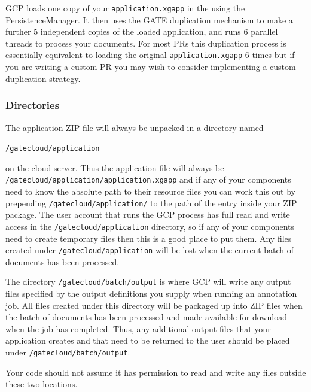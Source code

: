 GCP loads one copy of your \verb!application.xgapp! in the
using the PersistenceManager.  It then uses the GATE
{duplication mechanism}
to make a further 5 independent copies of the loaded application, and runs 6
parallel threads to process your documents.  For most PRs this duplication
process is essentially equivalent to loading the original \verb^application.xgapp^ 6
times but if you are writing a custom PR you may wish to consider implementing
a custom duplication strategy.

\subsubsection{Directories}

The application ZIP file will always be unpacked in a directory named
\begin{small}\verb^/gatecloud/application^\end{small} on the cloud server.  
Thus the application file will
always be\\
\verb^/gatecloud/application/application.xgapp^ and if any of your
components need to know the absolute path to their resource files you can work
this out by prepending \verb^/gatecloud/application/^ to the path of the entry
inside your ZIP package.  The user account that runs the GCP process has full
read and write access in the \verb^/gatecloud/application^ directory, so if any of
your components need to create temporary files then this is a good place to put
them.  Any files created under \verb^/gatecloud/application^ will be lost when the
current batch of documents has been processed.

The directory \verb^/gatecloud/batch/output^ is where GCP will write any output
files specified by the output definitions you supply when running an annotation
job.  All files created under this directory will be packaged up into ZIP files
when the batch of documents has been processed and made available for download
when the job has completed.  Thus, any additional output files that your
application creates and that need to be returned to the user should be placed
under \verb^/gatecloud/batch/output^.

Your code should not assume it has permission to read and write any files
outside these two locations.

